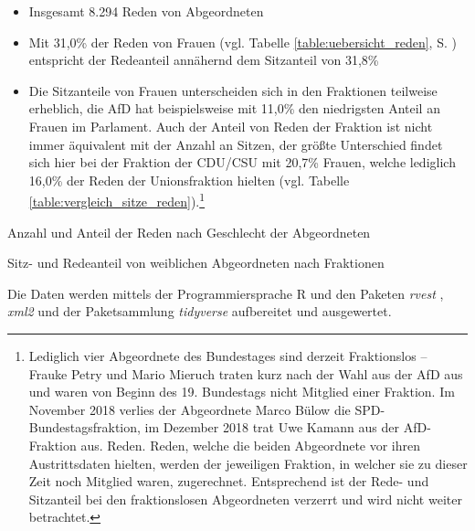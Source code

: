 \documentclass[12pt, 
    twoside=false, 
    bibliography=totoc, 
    numbers=endperiod, 
    headings=normal, 
    toc=chapterentrydotfill
    ]{scrbook}
\begin{document}
\begin{itemize}
    \item Insgesamt 8.294 Reden von Abgeordneten
    \item Mit 31,0\% der Reden von Frauen (vgl. Tabelle \ref{table:uebersicht_reden}, S. \pageref{table:uebersicht_reden}) entspricht der Redeanteil annähernd dem Sitzanteil von 31,8\% 
    \item Die Sitzanteile von Frauen unterscheiden sich in den Fraktionen teilweise erheblich, die AfD hat beispielsweise mit 11,0\% den niedrigsten Anteil an Frauen im Parlament. Auch der Anteil von Reden der Fraktion ist nicht immer äquivalent mit der Anzahl an Sitzen, der größte Unterschied findet sich hier bei der Fraktion der CDU/CSU mit 20,7\% Frauen, welche lediglich 16,0\% der Reden der Unionsfraktion hielten (vgl. Tabelle \ref{table:vergleich_sitze_reden}).\footnote{Lediglich vier Abgeordnete des Bundestages sind derzeit Fraktionslos --  Frauke Petry und Mario Mieruch traten kurz nach der Wahl aus der AfD aus und waren von Beginn des 19. Bundestags nicht Mitglied einer Fraktion. Im November 2018 verlies der Abgeordnete Marco Bülow die SPD-Bundestagsfraktion, im Dezember 2018 trat Uwe Kamann aus der AfD-Fraktion aus. Reden. Reden, welche die beiden Abgeordnete vor ihren Austrittsdaten hielten, werden der jeweiligen Fraktion, in welcher sie zu dieser Zeit noch Mitglied waren, zugerechnet. Entsprechend ist der Rede- und Sitzanteil bei den fraktionslosen Abgeordneten verzerrt und wird nicht weiter betrachtet.}
\end{itemize}

\begin{table}[htb]
    \centering
    \caption{Anzahl und Anteil der Reden nach Geschlecht der Abgeordneten}
    
    \label{table:uebersicht_reden}
\end{table}


\begin{table}[htb]
    \centering
    \caption{Sitz- und Redeanteil von weiblichen Abgeordneten nach Fraktionen}
    
    \label{table:vergleich_sitze_reden}
\end{table}



Die Daten werden mittels der Programmiersprache R \parencite{rcoreteam_2018} und den Paketen \emph{rvest} \parencite{wickham_2016}, \emph{xml2} \parencite{wickham_2018} und der Paketsammlung \emph{tidyverse} \parencite{wickham_2017} aufbereitet und ausgewertet.
\end{document}
